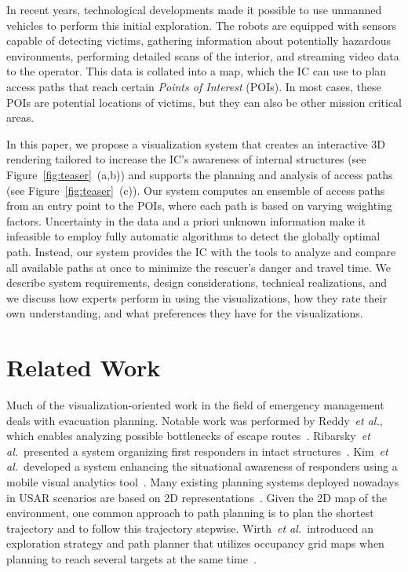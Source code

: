 \documentclass{egpubl}
\def\etal{\textit{et al.}}
\begin{document}
In recent years, technological developments made it possible to use unmanned vehicles to perform this initial exploration. The robots are equipped with sensors capable of detecting victims, gathering information about potentially hazardous environments, performing detailed scans of the interior, and streaming video data to the operator. This data is collated into a map, which the IC can use to plan access paths that reach certain \emph{Points of Interest} (POIs). In most cases, these POIs are potential locations of victims, but they can also be other mission critical areas.

In this paper, we propose a visualization system that creates an interactive 3D rendering tailored to increase the IC's awareness of internal structures (see Figure~\ref{fig:teaser}~(a,b)) and supports the planning and analysis of access paths (see Figure~\ref{fig:teaser}~(c)). Our system computes an ensemble of access paths from an entry point to the POIs, where each path is based on varying weighting factors. Uncertainty in the data and a priori unknown information make it infeasible to employ fully automatic algorithms to detect the globally optimal path. Instead, our system provides the IC with the tools to analyze and compare all available paths at once to minimize the rescuer's danger and travel time. We describe system requirements, design considerations, technical realizations, and we discuss how experts perform in using the visualizations, how they rate their own understanding, and what preferences they have for the visualizations.


\section{Related Work} \label{sec:relatedwork}
 Much of the visualization-oriented work in the field of emergency management deals with evacuation planning. Notable work was performed by Reddy~\etal, which enables analyzing possible bottlenecks of escape routes~\cite{EuroVA12:13-17:2012}. Ribarsky~\etal\ presented a system organizing first responders in intact structures~\cite{Ribarsky:2010}. Kim~\etal\ developed a system enhancing the situational awareness of responders using a mobile visual analytics tool~\cite{Kim:2008}. Many existing planning systems deployed nowadays in USAR scenarios are based on 2D representations~\cite{kleiner_et_al_ssrr09,KohlbrecherMeyerStrykKlingaufFlexibleSlamSystem2011}. Given the 2D map of the environment, one common approach to path planning is to plan the shortest trajectory and to follow this trajectory stepwise. Wirth~\etal\ introduced an exploration strategy and path planner that utilizes occupancy grid maps when planning to reach several targets at the same time~\cite{Wirth2007ETA1}.
\end{document}
